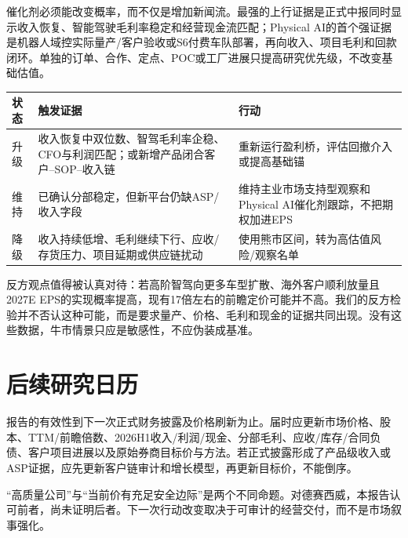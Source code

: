催化剂必须能改变概率，而不仅是增加新闻流。最强的上行证据是正式中报同时显示收入恢复、智能驾驶毛利率稳定和经营现金流匹配；Physical AI的首个强证据是机器人域控实际量产/客户验收或S6付费车队部署，再向收入、项目毛利和回款闭环。单独的订单、合作、定点、POC或工厂进展只提高研究优先级，不改变基础估值。

\begin{exhibitbox}[升级、维持与降级触发]
\small
\begin{tabularx}{\textwidth}{L{2cm}Y Y}
\toprule
状态 & 触发证据 & 行动 \\
\midrule
升级 & 收入恢复中双位数、智驾毛利率企稳、CFO与利润匹配；或新增产品闭合客户--SOP--收入链 & 重新运行盈利桥，评估回撤介入或提高基础锚 \\
维持 & 已确认分部稳定，但新平台仍缺ASP/收入字段 & 维持主业市场支持型观察和Physical AI催化剂跟踪，不把期权加进EPS \\
降级 & 收入持续低增、毛利继续下行、应收/存货压力、项目延期或供应链扰动 & 使用熊市区间，转为高估值风险/观察名单 \\
\bottomrule
\end{tabularx}
\end{exhibitbox}

反方观点值得被认真对待：若高阶智驾向更多车型扩散、海外客户顺利放量且2027E EPS的实现概率提高，现有17倍左右的前瞻定价可能并不高。我们的反方检验并不否认这种可能，而是要求量产、价格、毛利和现金的证据共同出现。没有这些数据，牛市情景只应是敏感性，不应伪装成基准。

\section{后续研究日历}

报告的有效性到下一次正式财务披露及价格刷新为止。届时应更新市场价格、股本、TTM/前瞻倍数、2026H1收入/利润/现金、分部毛利、应收/库存/合同负债、客户项目进展以及原始券商目标价与方法。若正式披露形成了产品级收入或ASP证据，应先更新客户链审计和增长模型，再更新目标价，不能倒序。

\begin{keyinsight}[投资纪律]
“高质量公司”与“当前价有充足安全边际”是两个不同命题。对德赛西威，本报告认可前者，尚未证明后者。下一次行动改变取决于可审计的经营交付，而不是市场叙事强化。
\end{keyinsight}
